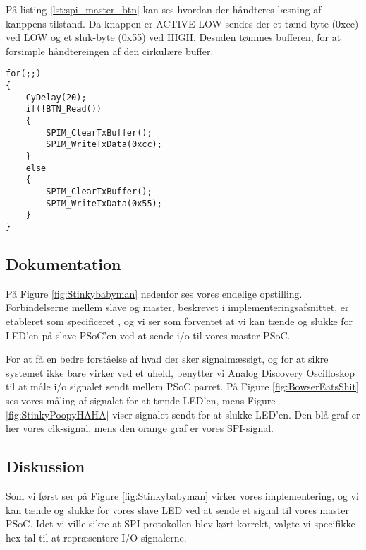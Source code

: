 \documentclass[../main.tex]{subfiles}
\begin{document}
På listing \ref{lst:spi_master_btn} kan ses hvordan der håndteres læsning af kanppens tilstand. Da knappen er ACTIVE-LOW sendes der et tænd-byte (0xcc) ved LOW og et sluk-byte (0x55) ved HIGH. Desuden tømmes bufferen, for at forsimple håndtereingen af den cirkulære buffer.

\begin{lstlisting}[caption={Håndtering af knappens input på SPI Master - med knap}, label=lst:spi_master_btn]
for(;;)
{
    CyDelay(20);
    if(!BTN_Read())
    {
        SPIM_ClearTxBuffer();
        SPIM_WriteTxData(0xcc); 
    }
    else
    {
        SPIM_ClearTxBuffer();
        SPIM_WriteTxData(0x55);
    }
}
\end{lstlisting}

\subsection{Dokumentation}
På Figure \ref{fig:Stinkybabyman} nedenfor ses vores endelige opstilling. Forbindelserne mellem slave og master, beskrevet i implementeringsafsnittet, er etableret som specificeret
, og vi ser som forventet at vi kan tænde og slukke for LED'en på slave PSoC'en ved at sende i/o til vores master PSoC.


For at få en bedre forståelse af hvad der sker signalmæssigt, og for at sikre systemet ikke bare virker ved et uheld, benytter vi Analog Discovery Oscilloskop til at måle  i/o signalet sendt mellem PSoC parret.
 På Figure \ref{fig:BowserEatsShit} ses vores måling af signalet for at tænde LED'en, mens Figure \ref{fig:StinkyPoopyHAHA} viser signalet sendt for at slukke LED'en. Den blå graf er her 
 vores clk-signal, mens den orange graf er vores SPI-signal. 

 
 
\subsection{Diskussion}
Som vi først ser på Figure \ref{fig:Stinkybabyman} virker vores implementering, og vi kan tænde og slukke for vores slave LED ved at sende et signal til vores master PSoC.
Idet vi ville sikre at SPI protokollen blev kørt korrekt, valgte vi specifikke hex-tal til at repræsentere I/O signalerne. 
\end{document}
